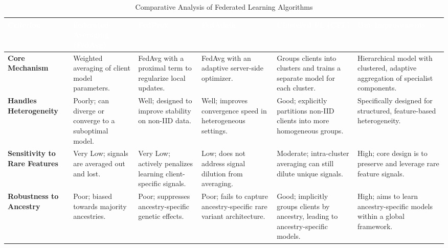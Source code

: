 \documentclass[conference]{IEEEtran}
\begin{document}
\begin{table}[!htbp]
    \centering
    \caption{Comparative Analysis of Federated Learning Algorithms}
    \label{comparative_analysis}
    \begin{tabular}{p{2.1cm} p{2.4cm} p{2.4cm} p{2.4cm} p{2.6cm} p{2.6cm}}
    \toprule
    \rowcolor{myBlue}
    \textbf{\textcolor{white}{Criterion}} & \textbf{\textcolor{white}{Federated Averaging (FedAvg)}} & \textbf{\textcolor{white}{FedProx}} & \textbf{\textcolor{white}{FedAdam}} & \textbf{\textcolor{white}{Clustered FL (CFL)}} & \textbf{\textcolor{white}{Our Improvements}} \\
    \midrule

    \textbf{Core Mechanism} & 
    Weighted averaging of client model parameters. &
    FedAvg with a proximal term to regularize local updates. &
    FedAvg with an adaptive server-side optimizer. &
    Groups clients into clusters and trains a separate model for each cluster. &
    Hierarchical model with clustered, adaptive aggregation of specialist components. \\
    \midrule

    \textbf{Handles Heterogeneity} & 
    Poorly; can diverge or converge to a suboptimal model. &
    Well; designed to improve stability on non-IID data. &
    Well; improves convergence speed in heterogeneous settings. &
    Good; explicitly partitions non-IID clients into more homogeneous groups. &
    Specifically designed for structured, feature-based heterogeneity. \\
    \midrule

    \textbf{Sensitivity to Rare Features} & 
    Very Low; signals are averaged out and lost. &
    Very Low; actively penalizes learning client-specific signals. &
    Low; does not address signal dilution from averaging. &
    Moderate; intra-cluster averaging can still dilute unique signals. &
    High; core design is to preserve and leverage rare feature signals. \\
    \midrule

    \textbf{Robustness to Ancestry} & 
    Poor; biased towards majority ancestries. &
    Poor; suppresses ancestry-specific genetic effects. &
    Poor; fails to capture ancestry-specific rare variant architecture. &
    Good; implicitly groups clients by ancestry, leading to ancestry-specific models. &
    High; aims to learn ancestry-specific models within a global framework. \\
    \midrule


\end{tabular}
\end{table}
\end{document}
